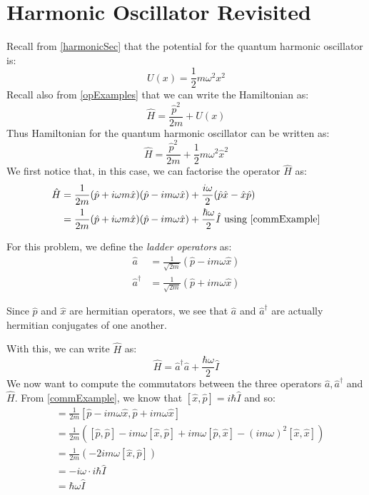 \documentclass[../main.tex]{subfiles}
\begin{document}
\section{Harmonic Oscillator Revisited}
\nonexaminable
Recall from \cref{harmonicSec} that the potential for the quantum harmonic oscillator is:
\[
  U(x) = \frac{1}{2} m\omega^2 x^2
\]
Recall also from \cref{opExamples} that we can write the Hamiltonian as:
\[
  \hat{H} = \frac{\hat{p}^2}{2m} + U(x)
\]
Thus Hamiltonian for the quantum harmonic oscillator can be written as:
\[
  \hat{H} = \frac{\hat{p}^2}{2m} + \frac{1}{2}m \omega^2 \hat{x}^2
\]
We first notice that, in this case, we can factorise the operator $\hat{H}$ as:
\begin{align*}
  \hat{H} &= \frac{1}{2m} (\hat{p} + i \omega m \hat{x})(\hat{p} - im \omega \hat{x}) + \frac{i\omega}{2}(\hat{p} \hat{x} - \hat{x} \hat{p}) \\
          &= \frac{1}{2m} (\hat{p} + i \omega m \hat{x})(\hat{p} - im \omega \hat{x}) + \frac{\hbar \omega}{2} \hat{I} \text{ using \cref{commExample}}
\end{align*}
\begin{definition}
  For this problem, we define the \textit{ladder operators} as:
  \begin{align*}
    \hat{a} &= \frac{1}{\sqrt{2m}}(\hat{p} - im\omega \hat{x}) \\
    \hat{a}^{\dag} &= \frac{1}{\sqrt{2m}}(\hat{p} + im\omega \hat{x})
  \end{align*}
\end{definition}
\begin{remark}
  Since $\hat{p}$ and $\hat{x}$ are hermitian operators, we see that $\hat{a}$ and $\hat{a}^{\dag}$ are actually hermitian conjugates of one another.
\end{remark}
With this, we can write $\hat{H}$ as:
\[
  \hat{H} = \hat{a}^{\dag} \hat{a} + \frac{\hbar \omega}{2}\hat{I}
\]
We now want to compute the commutators between the three operators $\hat{a}, \hat{a}^{\dag}$ and $\hat{H}$.
From \cref{commExample}, we know that $[\hat{x}, \hat{p}] = i\hbar \hat{I}$ and so:
\begin{align*}
  [\hat{a}, \hat{a}^{\dag}] &= \frac{1}{2m}[\hat{p} - im\omega\hat{x}, \hat{p} + im\omega\hat{x}] \\
                            &= \frac{1}{2m}([\hat{p}, \hat{p}] - im\omega[\hat{x}, \hat{p}] + im\omega[\hat{p}, \hat{x}] - (im\omega)^2[\hat{x}, \hat{x}]) \\
                            &= \frac{1}{2m}(-2im\omega[\hat{x}, \hat{p}]) \\
                            &= -i\omega \cdot i\hbar\hat{I} \\
                            &= \hbar \omega \hat{I} \\
\end{align*}
\end{document}
